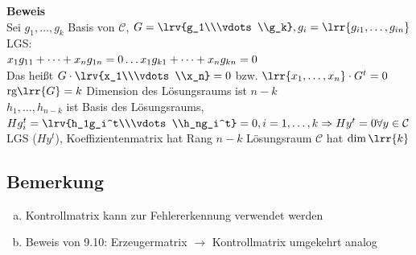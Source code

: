 		\newpage
		\textbf{Beweis}\\
		Sei $g_1,\dots,g_k$ Basis von $\mathcal{C}$, $G=\lrv{g_1\\\vdots\\g_k},g_i=\lrr{g_{i1},\dots,g_{in}}$
		LGS:\\
		$x_1g_{11}+\dots+x_ng_{1n}=0\\
		\dots\\
		x_1g_{k1}+\dots+x_ng_{kn}=0$\\
		Das heißt $G\cdot\lrv{x_1\\\vdots\\x_n}=0$ bzw. $\lrr{x_1,\dots,x_n}\cdot G^t=0$\\
		$\mbox{rg}\lrr{G}=k$ Dimension des Lösungsraums ist $n-k$\\
		$h_1,\dots,h_{n-k}$ ist Basis des Lösungsraums,\\
		$Hg_i^t=\lrv{h_1g_i^t\\\vdots\\h_ng_i^t}=0,i=1,\dots,k\Rightarrow Hy^t=0\forall y\in\mathcal{C}$\\
		LGS ($Hy^t$), Koeffizientenmatrix hat Rang $n-k$ Lösungsraum $\mathcal{C}$ hat $\dim\lrr{k}$
		
	\subsection{Bemerkung}
		\begin{enumerate}[a)]
			\item Kontrollmatrix kann zur Fehlererkennung verwendet werden
			\item Beweis von 9.10: Erzeugermatrix $\rightarrow$ Kontrollmatrix umgekehrt analog
		\end{enumerate}

